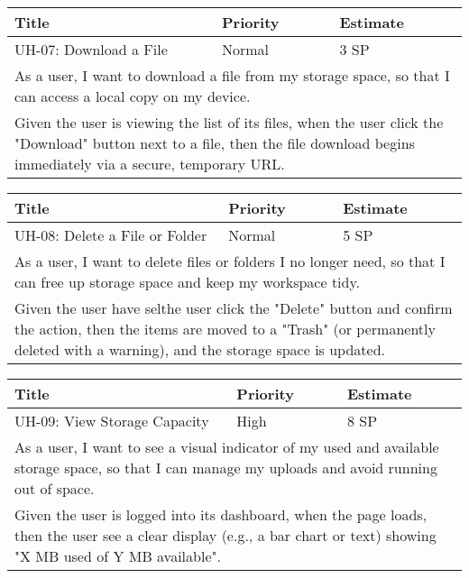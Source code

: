 \vspace{5mm}
\begin{tabular}{|p{4cm}|p{5cm}|p{5cm}|}
    \hline
    \textbf{Title} & \textbf{Priority} & \textbf{Estimate} \\
    \hline
    UH-07: Download a File & Normal & 3 SP \\
    \hline
    \multicolumn{3}{|p{14cm}|}{As a user, I want to download a file from my storage space, so that I can access a local copy on my device.} \\
    \hline
    \multicolumn{3}{|p{14cm}|}{Given the user is viewing the list of its files, when the user click the "Download" button next to a file, then the file download begins immediately via a secure, temporary URL.} \\
    \hline
\end{tabular}

\vspace{5mm}
\begin{tabular}{|p{4cm}|p{5cm}|p{5cm}|}
    \hline
    \textbf{Title} & \textbf{Priority} & \textbf{Estimate} \\
    \hline
    UH-08: Delete a File or Folder & Normal & 5 SP \\
    \hline
    \multicolumn{3}{|p{14cm}|}{As a user, I want to delete files or folders I no longer need, so that I can free up storage space and keep my workspace tidy.} \\
    \hline
    \multicolumn{3}{|p{14cm}|}{Given the user have selthe user click the "Delete" button and confirm the action, then the items are moved to a "Trash" (or permanently deleted with a warning), and the storage space is updated.} \\
    \hline
\end{tabular}

\vspace{5mm}
\begin{tabular}{|p{4cm}|p{5cm}|p{5cm}|}
    \hline
    \textbf{Title} & \textbf{Priority} & \textbf{Estimate} \\
    \hline
    UH-09: View Storage Capacity & High & 8 SP \\
    \hline
    \multicolumn{3}{|p{14cm}|}{As a user, I want to see a visual indicator of my used and available storage space, so that I can manage my uploads and avoid running out of space.} \\
    \hline
    \multicolumn{3}{|p{14cm}|}{Given the user is logged into its dashboard, when the page loads, then the user see a clear display (e.g., a bar chart or text) showing "X MB used of Y MB available".} \\
    \hline
\end{tabular}

